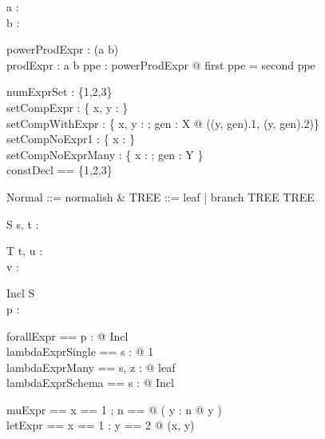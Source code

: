 \begin{axdef}
  a : \power \nat\\
  b : \power \nat
\end{axdef}

\begin{axdef}
  powerProdExpr : \power (a \cross b)\\
  prodExpr : a \cross b
\where
  \forall ppe : powerProdExpr @ first ppe = second ppe
\end{axdef}

\begin{gendef}[X, Y]
  numExprSet : \{1,2,3\}\\
  setCompExpr : \power \{ x, y : \nat \}\\
  setCompWithExpr : \{ x, y : \nat ; gen : X @ ((y, gen).1, (y, gen).2)\}\\
  setCompNoExpr1 : \{ x : \nat \}\\
  setCompNoExprMany : \{ x : \nat; gen : Y \}\\
  constDecl == \{1,2,3\}
\end{gendef}

\begin{zed}
  Normal ::= normalish \ldata \nat \rdata &
  TREE ::= leaf | branch \ldata \nat \cross TREE \cross TREE \rdata
\end{zed}

\begin{schema}{S}
  s, t : \nat
\end{schema}

\begin{schema}{T}
  t, u : \nat\\
  v : \power \nat
\end{schema}

\begin{schema}{Incl}
  S\\
  p : \nat
\end{schema}

\begin{zed}
  forallExpr == \forall p : \nat @ Incl\\
  lambdaExprSingle == \lambda s : \nat @ 1\\
  lambdaExprMany == \lambda s, z : \nat @ leaf\\
  lambdaExprSchema == \lambda s : \nat @ Incl\\
\end{zed}

\begin{zed}
  muExpr == \mu x == 1 ; n == \nat @ ( \mu y : n @ y )\\
  letExpr == \LET x == 1 ; y == 2 @ (x, y)
\end{zed}

